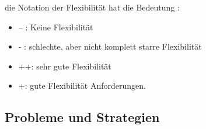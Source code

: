 \documentclass[enabledeprecatedfontcommands,fontsize=12pt,paper=a4,twoside]{scrartcl}
\begin{document}
die Notation der Flexibilität hat die  Bedeutung :
\begin{itemize}
    \item -- : Keine Flexibilität
    \item - : schlechte, aber nicht komplett starre Flexibilität
    \item ++: sehr gute Flexibilität
    \item +: gute Flexibilität
      Anforderungen.
  \end{itemize} 


\subsection{Probleme und Strategien} \label{sec:strategien}




\end{document}
